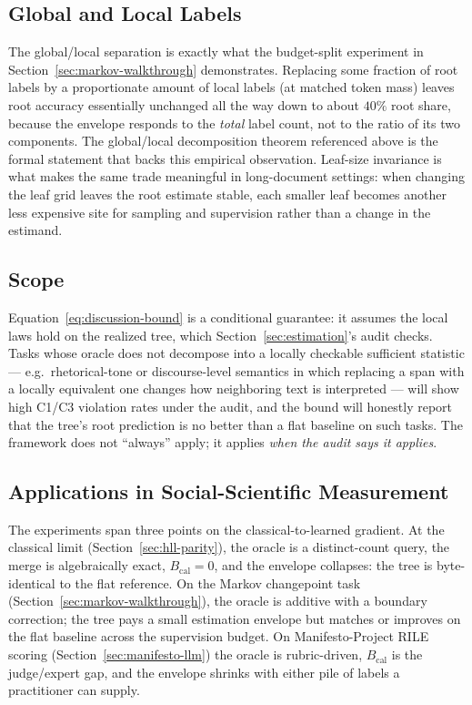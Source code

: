 \subsection{Global and Local Labels}

The global/local separation is exactly what the budget-split
experiment in Section~\ref{sec:markov-walkthrough} demonstrates.
Replacing some fraction of root labels by a proportionate amount of
local labels (at matched token mass) leaves root accuracy essentially
unchanged all the way down to about $40\%$ root share, because the
envelope responds to the \emph{total} label count, not to the ratio
of its two components. The global/local decomposition theorem referenced
above is the formal statement that backs this empirical observation.
Leaf-size invariance is what makes the same trade meaningful in
long-document settings: when changing the leaf grid leaves the root
estimate stable, each smaller leaf becomes another less expensive site
for sampling and supervision rather than a change in the estimand.

\subsection{Scope}

Equation~\eqref{eq:discussion-bound} is a conditional guarantee: it
assumes the local laws hold on the realized tree, which
Section~\ref{sec:estimation}'s audit checks. Tasks whose oracle does
not decompose into a locally checkable sufficient statistic --- e.g.\
rhetorical-tone or discourse-level semantics in which replacing a
span with a locally equivalent one changes how neighboring text is
interpreted --- will show high C1/C3 violation rates under the audit,
and the bound will honestly report that the tree's root prediction is
no better than a flat baseline on such tasks. The framework does not
``always'' apply; it applies \emph{when the audit says it applies}.

\subsection{Applications in Social-Scientific Measurement}

The experiments span three points on the classical-to-learned
gradient. At the classical limit (Section~\ref{sec:hll-parity}), the
oracle is a distinct-count query, the merge is algebraically exact,
$B_{\mathrm{cal}} = 0$, and the envelope collapses: the tree is
byte-identical to the flat reference. On the Markov changepoint task
(Section~\ref{sec:markov-walkthrough}), the oracle is additive with a
boundary correction; the tree pays a small estimation envelope but
matches or improves on the flat baseline across the supervision
budget. On Manifesto-Project RILE scoring (Section~\ref{sec:manifesto-llm})
the oracle is rubric-driven, $B_{\mathrm{cal}}$ is the judge/expert
gap, and the envelope shrinks with either pile of labels a
practitioner can supply.

